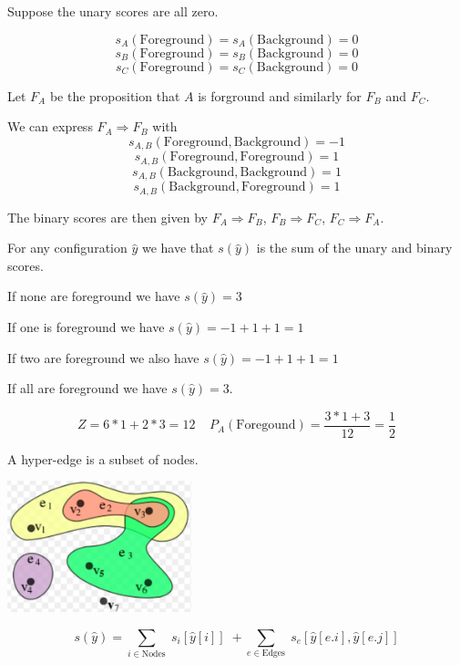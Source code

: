 \vfill
Suppose the unary scores are all zero.

\vfill
$$s_A(\mathrm{Foreground}) = s_A(\mathrm{Background}) = 0$$
$$s_B(\mathrm{Foreground}) = s_B(\mathrm{Background}) = 0$$
$$s_C(\mathrm{Foreground}) = s_C(\mathrm{Background}) = 0$$



\vfill
Let $F_A$ be the proposition that $A$ is forground and similarly for $F_B$ and $F_C$.

\vfill
We can express $F_A \Rightarrow F_B$ with
$$s_{A,B}(\mathrm{Foreground},\mathrm{Background}) = -1$$
$$s_{A,B}(\mathrm{Foreground},\mathrm{Foreground}) = 1$$
$$s_{A,B}(\mathrm{Background},\mathrm{Background}) = 1$$
$$s_{A,B}(\mathrm{Background},\mathrm{Foreground}) = 1$$

\vfill
The binary scores are then given by
$F_A \Rightarrow F_B$, $F_B \Rightarrow F_C$, $F_C \Rightarrow F_A$.


For any configuration $\hat{y}$ we have that $s(\hat{y})$ is the sum of the unary and binary scores.

\vfill
If none are foreground we have $s(\hat{y}) = 3$

\vfill
If one is foreground we have $s(\hat{y}) = -1 + 1+ 1 = 1$

\vfill
If two are foreground we also have $s(\hat{y}) = -1 + 1+ 1 = 1$

\vfill
If all are foreground we have $s(\hat{y}) = 3$.

\vfill
$$Z = 6*1 + 2*3 = 12\;\;\;\;P_A(\mathrm{Foregound}) = \frac{3*1 + 3}{12} = \frac{1}{2}$$




A hyper-edge is a subset of nodes.

\vfill
\centerline{\includegraphics[height = 1.5in]{../images/HyperGraph}}


$$s(\hat{y}) = \sum_{i \in \mathrm{Nodes}}\; s_i[\hat{y}[i]]\; + \sum_{e \in \mathrm{Edges}}\;s_e[\hat{y}[e.i],\hat{y}[e.j]]$$

